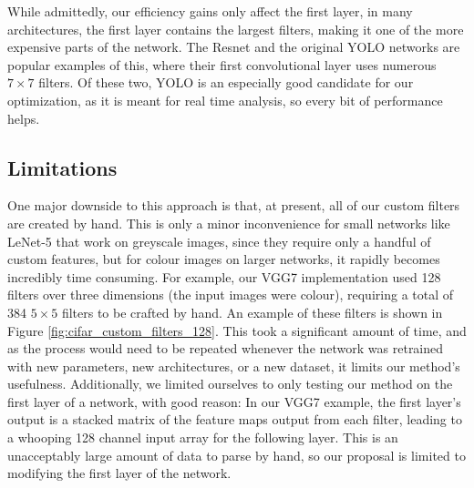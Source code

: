 \documentclass[11pt,a4paper,oldfontcommands]{memoir}
\begin{document}
While admittedly, our efficiency gains only affect the first layer, in many architectures, the first layer contains the largest filters, making it one of the more expensive parts of the network. The Resnet \cite{resnet} and the original YOLO \cite{yolo} networks are popular examples of this, where their first convolutional layer uses numerous $7\times7$ filters. Of these two, YOLO is an especially good candidate for our optimization, as it is meant for real time analysis, so every bit of performance helps. 

\subsection{Limitations}
One major downside to this approach is that, at present, all of our custom filters are created by hand. This is only a minor inconvenience for small networks like LeNet-5 that work on greyscale images, since they require only a handful of custom features, but for colour images on larger networks, it rapidly becomes incredibly time consuming. For example, our VGG7 implementation used 128 filters over three dimensions (the input images were colour), requiring a total of 384 $5 \times 5$ filters to be crafted by hand. An example of these filters is shown in Figure \ref{fig:cifar_custom_filters_128}. This took a significant amount of time, and as the process would need to be repeated whenever the network was retrained with new parameters, new architectures, or a new dataset, it limits our method's usefulness. Additionally, we limited ourselves to only testing our method on the first layer of a network, with good reason: In our VGG7 example, the first layer's output is a stacked matrix of the feature maps output from each filter, leading to a whooping 128 channel input array for the following layer. This is an unacceptably large amount of data to parse by hand, so our proposal is limited to modifying the first layer of the network.
\end{document}
